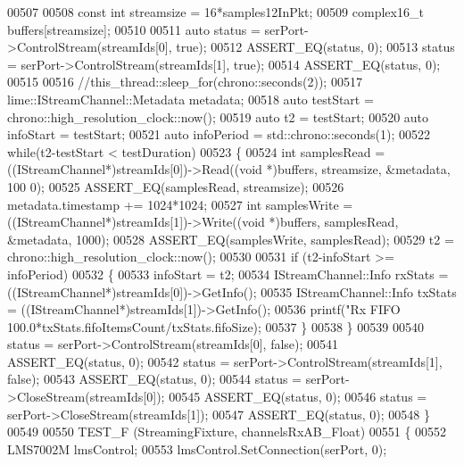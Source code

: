 \begin{DoxyCode}
{{{{{00507 
00508     \textcolor{keyword}{const} \textcolor{keywordtype}{int} streamsize = 16*samples12InPkt;
00509     complex16_t buffers[streamsize];
00510 
00511     \textcolor{keyword}{auto} status = serPort->ControlStream(streamIds[0], \textcolor{keyword}{true});
00512     ASSERT\_EQ(status, 0);
00513     status = serPort->ControlStream(streamIds[1], \textcolor{keyword}{true});
00514     ASSERT\_EQ(status, 0);
00515 
00516     \textcolor{comment}{//this\_thread::sleep\_for(chrono::seconds(2));}
00517     lime::IStreamChannel::Metadata metadata;
00518     \textcolor{keyword}{auto} testStart = chrono::high\_resolution\_clock::now();
00519     \textcolor{keyword}{auto} t2 = testStart;
00520     \textcolor{keyword}{auto} infoStart = testStart;
00521     \textcolor{keyword}{auto} infoPeriod = std::chrono::seconds(1);
00522     \textcolor{keywordflow}{while}(t2-testStart < testDuration)
00523     \{
00524         \textcolor{keywordtype}{int} samplesRead = ((IStreamChannel*)streamIds[0])->Read((\textcolor{keywordtype}{void} *)buffers, streamsize, &metadata, 100
      0);
00525         ASSERT\_EQ(samplesRead, streamsize);
00526         metadata.timestamp += 1024*1024;
00527         \textcolor{keywordtype}{int} samplesWrite = ((IStreamChannel*)streamIds[1])->Write((\textcolor{keywordtype}{void} *)buffers, samplesRead, &metadata, 
      1000);
00528         ASSERT\_EQ(samplesWrite, samplesRead);
00529         t2 = chrono::high\_resolution\_clock::now();
00530 
00531         \textcolor{keywordflow}{if} (t2-infoStart >= infoPeriod)
00532         \{
00533             infoStart = t2;
00534             IStreamChannel::Info rxStats = ((IStreamChannel*)streamIds[0])->GetInfo();
00535             IStreamChannel::Info txStats = ((IStreamChannel*)streamIds[1])->GetInfo();
00536             printf(\textcolor{stringliteral}{"Rx FIFO %
       100.0*txStats.fifoItemsCount/txStats.fifoSize);
00537         \}
00538     \}
00539 
00540     status = serPort->ControlStream(streamIds[0], \textcolor{keyword}{false});
00541     ASSERT\_EQ(status, 0);
00542     status = serPort->ControlStream(streamIds[1], \textcolor{keyword}{false});
00543     ASSERT\_EQ(status, 0);
00544     status = serPort->CloseStream(streamIds[0]);
00545     ASSERT\_EQ(status, 0);
00546     status = serPort->CloseStream(streamIds[1]);
00547     ASSERT\_EQ(status, 0);
00548 \}
00549 
00550 TEST_F (StreamingFixture, channelsRxAB\_Float)
00551 \{
00552     LMS7002M lmsControl;
00553     lmsControl.SetConnection(serPort, 0);
}}}}}}
\end{DoxyCode}
